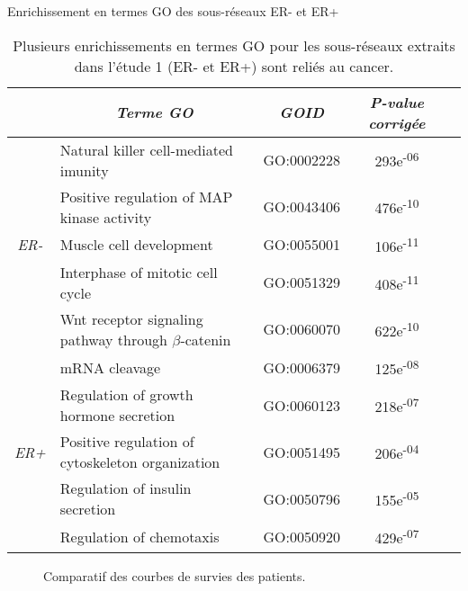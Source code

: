 		\begin{table}
				\begin{center}
					\caption{Enrichissement en termes \acs{GO} des sous-réseaux ER- et ER+}
					\begin{tabular}{clccr}
						\toprule
						& \multicolumn{1}{c}{\emph{Terme \acs{GO}}} & \emph{GOID} & \emph{P-value corrigée} \\
						\midrule
						\multirow{5}{*}{\emph{ER-}} & Natural killer cell-mediated imunity                      & GO:0002228  & 293e\textsuperscript{-06} \\
																				& Positive regulation of MAP kinase activity                & GO:0043406  & 476e\textsuperscript{-10} \\
																				& Muscle cell development                                   & GO:0055001  & 106e\textsuperscript{-11} \\
																				& Interphase of mitotic cell cycle                          & GO:0051329  & 408e\textsuperscript{-11} \\
																				& Wnt receptor signaling pathway through ${\beta}$-catenin  & GO:0060070  & 622e\textsuperscript{-10} \\
						\midrule
						\multirow{5}{*}{\emph{ER+}} & mRNA cleavage                                             & GO:0006379  & 125e\textsuperscript{-08} \\
																				& Regulation of growth hormone secretion                    & GO:0060123  & 218e\textsuperscript{-07} \\
																				& Positive regulation of cytoskeleton organization          & GO:0051495  & 206e\textsuperscript{-04} \\
																				& Regulation of insulin secretion                           & GO:0050796  & 155e\textsuperscript{-05} \\
																				& Regulation of chemotaxis                                  & GO:0050920  & 429e\textsuperscript{-07} \\
						\bottomrule
					\end{tabular}
					\label{tab:Res2GO}
					\vspace{5ex}
					\caption*{Plusieurs enrichissements en termes \acs{GO} pour les sous-réseaux extraits dans l'étude 1 (ER- et ER+) sont reliés au cancer.}
				\end{center}
			\end{table}

			\begin{figure}
				\begin{center}
					\def\svgwidth{\columnwidth}
					\caption{Comparatif des courbes de survies des patients.}
					\label{fig:Survival}
				\end{center}
			\end{figure}

